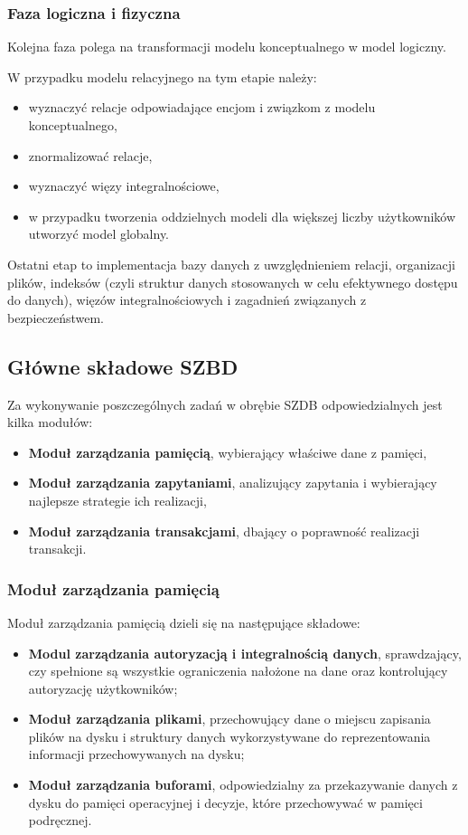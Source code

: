\subsubsection{Faza logiczna i fizyczna}

Kolejna faza polega na transformacji modelu konceptualnego w model logiczny.

W przypadku modelu relacyjnego na tym etapie należy:
\begin{itemize}
    \item wyznaczyć relacje odpowiadające encjom i związkom z modelu konceptualnego,
    \item znormalizować relacje,
    \item wyznaczyć więzy integralnościowe,
    \item w przypadku tworzenia oddzielnych modeli dla większej liczby użytkowników utworzyć model globalny.
\end{itemize}

Ostatni etap to implementacja bazy danych z uwzględnieniem relacji, organizacji plików, indeksów (czyli struktur danych stosowanych w celu efektywnego dostępu do danych), więzów integralnościowych i zagadnień związanych z bezpieczeństwem.

\subsection{Główne składowe SZBD}

Za wykonywanie poszczególnych zadań w obrębie SZDB odpowiedzialnych jest kilka modułów:
\begin{itemize}
    \item \textbf{Moduł zarządzania pamięcią}, wybierający właściwe dane z pamięci,
    \item \textbf{Moduł zarządzania zapytaniami}, analizujący zapytania i wybierający najlepsze strategie ich realizacji,
    \item \textbf{Moduł zarządzania transakcjami}, dbający o poprawność realizacji transakcji.
\end{itemize}

\subsubsection{Moduł zarządzania pamięcią}

Moduł zarządzania pamięcią dzieli się na następujące składowe:
\begin{itemize}
    \item \textbf{Modul zarządzania autoryzacją i integralnością danych},  sprawdzający, czy spełnione są wszystkie ograniczenia nałożone na dane oraz kontrolujący autoryzację użytkowników;
    \item \textbf{Moduł zarządzania plikami}, przechowujący dane o miejscu zapisania plików na dysku i struktury danych wykorzystywane do reprezentowania informacji przechowywanych na dysku;
    \item \textbf{Moduł zarządzania buforami}, odpowiedzialny za przekazywanie danych z dysku do pamięci operacyjnej i decyzje, które przechowywać w pamięci podręcznej.
\end{itemize}

